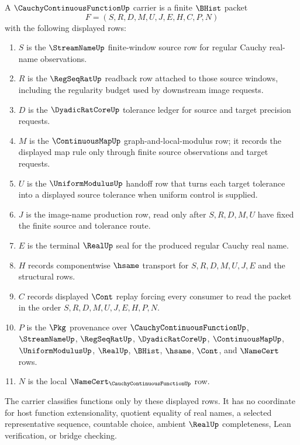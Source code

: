 \begin{definition}
\label{def:cauchy-continuous-function-carrier}
A $\CauchyContinuousFunctionUp$ carrier is a finite $\BHist$ packet
$$
F=(S,R,D,M,U,J,E,H,C,P,N)
$$
with the following displayed rows:
\begin{enumerate}
\item $S$ is the $\StreamNameUp$ finite-window source row for regular Cauchy real-name observations.
\item $R$ is the $\RegSeqRatUp$ readback row attached to those source windows, including the regularity budget used by downstream image requests.
\item $D$ is the $\DyadicRatCoreUp$ tolerance ledger for source and target precision requests.
\item $M$ is the $\ContinuousMapUp$ graph-and-local-modulus row; it records the displayed map rule only through finite source observations and target requests.
\item $U$ is the $\UniformModulusUp$ handoff row that turns each target tolerance into a displayed source tolerance when uniform control is supplied.
\item $J$ is the image-name production row, read only after $S,R,D,M,U$ have fixed the finite source and tolerance route.
\item $E$ is the terminal $\RealUp$ seal for the produced regular Cauchy real name.
\item $H$ records componentwise $\hsame$ transport for $S,R,D,M,U,J,E$ and the structural rows.
\item $C$ records displayed $\Cont$ replay forcing every consumer to read the packet in the order $S,R,D,M,U,J,E,H,P,N$.
\item $P$ is the $\Pkg$ provenance over $\CauchyContinuousFunctionUp$, $\StreamNameUp$, $\RegSeqRatUp$, $\DyadicRatCoreUp$, $\ContinuousMapUp$, $\UniformModulusUp$, $\RealUp$, $\BHist$, $\hsame$, $\Cont$, and $\NameCert$ rows.
\item $N$ is the local $\NameCert_{\CauchyContinuousFunctionUp}$ row.
\end{enumerate}
The carrier classifies functions only by these displayed rows. It has no coordinate for host function extensionality, quotient equality of real names, a selected representative sequence, countable choice, ambient $\RealUp$ completeness, Lean verification, or bridge checking.
\end{definition}

